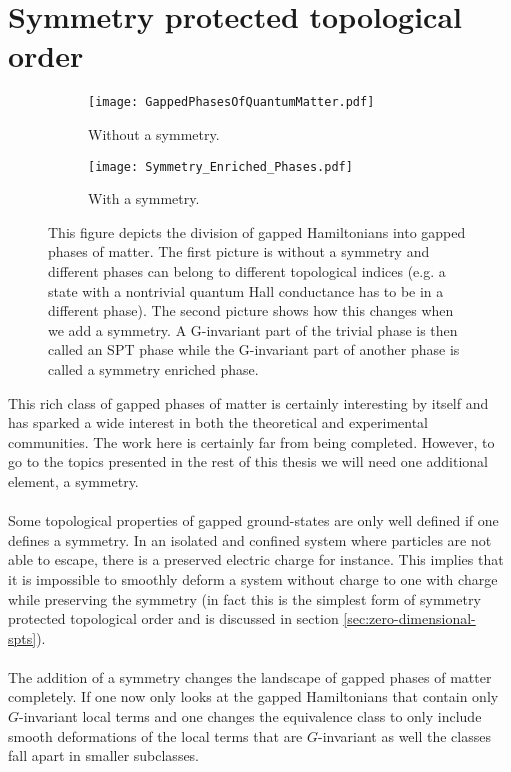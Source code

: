 \section{Symmetry protected topological order}
\begin{figure}
	\begin{subfigure}[b]{0.45\textwidth}
		\centering
		\texttt{[image: GappedPhasesOfQuantumMatter.pdf]}
		\caption{Without a symmetry.}
	\end{subfigure}
	\hfil
	\begin{subfigure}[b]{0.45\textwidth}
		\centering
		\texttt{[image: Symmetry\_Enriched\_Phases.pdf]}
		\caption{With a symmetry.}
	\end{subfigure}
	\caption{This figure depicts the division of gapped Hamiltonians into gapped phases of matter. The first picture is without a symmetry and different phases can belong to different topological indices (e.g. a state with a nontrivial quantum Hall conductance has to be in a different phase). The second picture shows how this changes when we add a symmetry. A G-invariant part of the trivial phase is then called an SPT phase while the G-invariant part of another phase is called a symmetry enriched phase.}
	\label{fig:SymmetryEnrichedIntroduction}
\end{figure}
This rich class of gapped phases of matter is certainly interesting by itself and has sparked a wide interest in both the theoretical and experimental communities. The work here is certainly far from being completed. However, to go to the topics presented in the rest of this thesis we will need one additional element, a symmetry.
\\\\
Some topological properties of gapped ground-states are only well defined if one defines a symmetry. In an isolated and confined system where particles are not able to escape, there is a preserved electric charge for instance. This implies that it is impossible to smoothly deform a system without charge to one with charge while preserving the symmetry (in fact this is the simplest form of symmetry protected topological order and is discussed in section \ref{sec:zero-dimensional-spts}).
\\\\
The addition of a symmetry changes the landscape of gapped phases of matter completely. If one now only looks at the gapped Hamiltonians that contain only $G$-invariant local terms and one changes the equivalence class to only include smooth deformations of the local terms that are $G$-invariant as well the classes fall apart in smaller subclasses.
